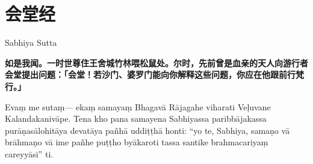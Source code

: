 \section{会堂经}

\begin{center}Sabhiya Sutta\end{center}\vspace{1em}

\textbf{如是我闻。一时世尊住王舍城竹林喂松鼠处。尔时，先前曾是血亲的天人向游行者会堂提出问题：「会堂！若沙门、婆罗门能向你解释这些问题，你应在他跟前行梵行。」}

Evaṃ me sutaṃ— ekaṃ samayaṃ Bhagavā Rājagahe viharati Veḷuvane Kalandakanivāpe. Tena kho pana samayena Sabhiyassa paribbājakassa purāṇasālohitāya devatāya pañhā uddiṭṭhā honti: “yo te, Sabhiya, samaṇo vā brāhmaṇo vā ime pañhe puṭṭho byākaroti tassa santike brahmacariyaṃ careyyāsī” ti.

